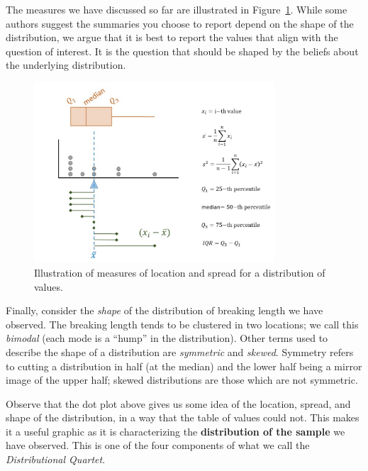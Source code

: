 \documentclass[
  letterpaper,
  DIV=11,
  numbers=noendperiod]{scrreprt}
\theoremstyle{definition}
\theoremstyle{definition}
\theoremstyle{plain}
\theoremstyle{remark}
\begin{document}
The measures we have discussed so far are illustrated in
Figure~\ref{fig-summaries-summaries}. While some authors suggest the
summaries you choose to report depend on the shape of the distribution,
we argue that it is best to report the values that align with the
question of interest. It is the question that should be shaped by the
beliefs about the underlying distribution.

\begin{figure}

{\centering \includegraphics[width=0.8\textwidth,height=\textheight]{./images/Summaries-Summaries.jpg}

}

\caption{\label{fig-summaries-summaries}Illustration of measures of
location and spread for a distribution of values.}

\end{figure}

Finally, consider the \emph{shape} of the distribution of breaking
length we have observed. The breaking length tends to be clustered in
two locations; we call this \emph{bimodal} (each mode is a ``hump'' in
the distribution). Other terms used to describe the shape of a
distribution are \emph{symmetric} and \emph{skewed}. Symmetry refers to
cutting a distribution in half (at the median) and the lower half being
a mirror image of the upper half; skewed distributions are those which
are not symmetric.

Observe that the dot plot above gives us some idea of the location,
spread, and shape of the distribution, in a way that the table of values
could not. This makes it a useful graphic as it is characterizing the
\textbf{distribution of the sample} we have observed. This is one of the
four components of what we call the \emph{Distributional Quartet}.
\end{document}
